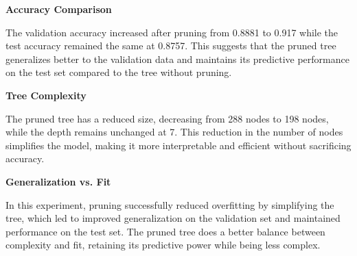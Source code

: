 \documentclass[11pt]{article}
\begin{document}
\begin{enumerate}
\textbf{Accuracy Comparison}
    
    The validation accuracy increased after pruning from 0.8881 to 0.917 while the test accuracy remained the same at 0.8757. This suggests that the pruned tree generalizes better to the validation data and maintains its predictive performance on the test set compared to the tree without pruning.

\textbf{Tree Complexity}

    The pruned tree has a reduced size, decreasing from 288 nodes to 198 nodes, while the depth remains unchanged at 7. This reduction in the number of nodes simplifies the model, making it more interpretable and efficient without sacrificing accuracy.

\textbf{Generalization vs. Fit}

    In this experiment, pruning successfully reduced overfitting by simplifying the tree, which led to improved generalization on the validation set and maintained performance on the test set. The pruned tree does a better balance between complexity and fit, retaining its predictive power while being less complex.
    

\end{enumerate}
\end{document}
